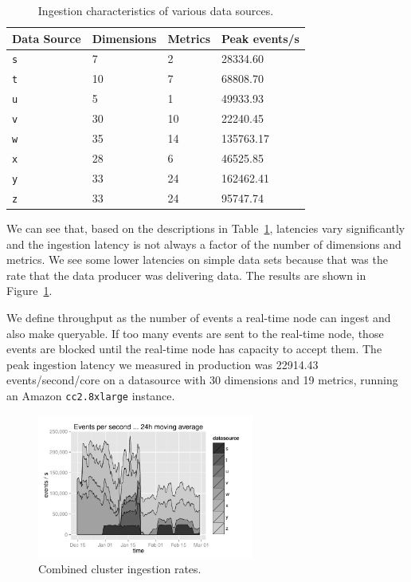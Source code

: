 \documentclass{sig-alternate-2013}
\begin{document}
\begin{table}
  \centering
  \begin{tabular}{| l | l | l | l |}
    \hline
    \scriptsize\textbf{Data Source} & \scriptsize\textbf{Dimensions} & \scriptsize\textbf{Metrics} & \scriptsize\textbf{Peak events/s} \\ \hline
    \texttt{s} & 7 & 2 & 28334.60 \\ \hline
    \texttt{t} & 10 & 7 & 68808.70 \\ \hline
    \texttt{u} & 5 & 1 & 49933.93 \\ \hline
    \texttt{v} & 30 & 10 & 22240.45 \\ \hline
    \texttt{w} & 35 & 14 & 135763.17 \\ \hline
    \texttt{x} & 28 & 6 & 46525.85 \\ \hline
    \texttt{y} & 33 & 24 & 162462.41 \\ \hline
    \texttt{z} & 33 & 24 & 95747.74 \\ \hline
  \end{tabular}
  \caption{Ingestion characteristics of various data sources.}
  \label{tab:ingest_datasources}
\end{table}

We can see that, based on the descriptions in
Table~\ref{tab:ingest_datasources}, latencies vary significantly and the
ingestion latency is not always a factor of the number of dimensions and
metrics. We see some lower latencies on simple data sets because that was the
rate that the data producer was delivering data. The results are shown in
Figure~\ref{fig:ingestion_rate}.

We define throughput as the number of events a
real-time node can ingest and also make queryable. If too many events are sent
to the real-time node, those events are blocked until the real-time node has
capacity to accept them. The peak ingestion latency we measured in production
was 22914.43 events/second/core on a datasource with 30 dimensions and 19 metrics,
running an Amazon \texttt{cc2.8xlarge} instance.

\begin{figure}
\centering
\includegraphics[width = 2.8in]{ingestion_rate}
\caption{Combined cluster ingestion rates.}
\label{fig:ingestion_rate}
\end{figure}
\end{document}
